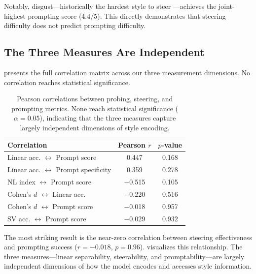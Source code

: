 Notably, disgust---historically the hardest style to steer \citep{konen2024style}---achieves the joint-highest prompting score (4.4/5). This directly demonstrates that steering difficulty does not predict prompting difficulty.

\subsection{The Three Measures Are Independent}

 presents the full correlation matrix across our three measurement dimensions. No correlation reaches statistical significance.

\begin{table}[t]
    \centering
    \caption{Pearson correlations between probing, steering, and prompting metrics. None reach statistical significance ($\alpha = 0.05$), indicating that the three measures capture largely independent dimensions of style encoding.}
    \label{tab:correlations}
    \begin{tabular}{@{}lcc@{}}
        \toprule
        Correlation & Pearson $r$ & $p$-value \\
        \midrule
        Linear acc. $\leftrightarrow$ Prompt score & 0.447 & 0.168 \\
        Linear acc. $\leftrightarrow$ Prompt specificity & 0.359 & 0.278 \\
        NL index $\leftrightarrow$ Prompt score & $-$0.515 & 0.105 \\
        Cohen's $d$ $\leftrightarrow$ Linear acc. & $-$0.220 & 0.516 \\
        Cohen's $d$ $\leftrightarrow$ Prompt score & $-$0.018 & 0.957 \\
        SV acc. $\leftrightarrow$ Prompt score & $-$0.029 & 0.932 \\
        \bottomrule
    \end{tabular}
\end{table}

The most striking result is the near-zero correlation between steering effectiveness and prompting success ($r = -0.018$, $p = 0.96$).  visualizes this relationship. The three measures---linear separability, steerability, and promptability---are largely independent dimensions of how the model encodes and accesses style information.

